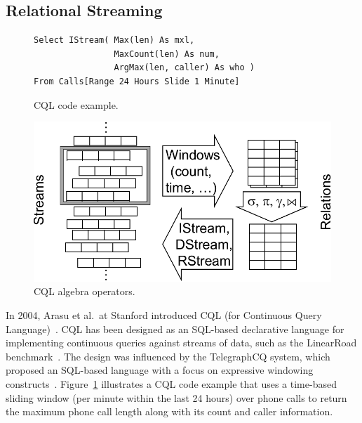 \subsection{Relational Streaming}\label{sec:sql} %

\begin{figure}[!h]
\begin{lstlisting}[morekeywords={Select,IStream,As,From,Range,Slide}]
Select IStream( Max(len) As mxl,
                MaxCount(len) As num,
                ArgMax(len, caller) As who )
From Calls[Range 24 Hours Slide 1 Minute]
\end{lstlisting}
\vspace*{-4mm}
\caption{\label{fig:cql}CQL code example.}
\end{figure}

\begin{figure}
\centerline{\includegraphics[scale=0.45]{cqlops.pdf}}
\vspace*{-4mm}
\caption{\label{fig:cqlops}CQL algebra operators.}
\end{figure}

In 2004, Arasu et al.\ at Stanford introduced \textsf{CQL} (for Continuous
Query Language)~\cite{arasu_widom_2004}. CQL has been designed as an
SQL-based declarative language for implementing continuous queries
against streams of data, such as the LinearRoad
benchmark~\cite{arasu_et_al_2004}. The design was influenced by the
\textsf{TelegraphCQ} system, which proposed an SQL-based language with a
focus on expressive windowing
constructs~\cite{chandrasekaran_et_al_2003}.
Figure~\ref{fig:cql} illustrates a CQL code example that
uses a time-based sliding window (per minute within the last 24 hours) over
phone calls to return the maximum phone call length along with its
count and caller information.

